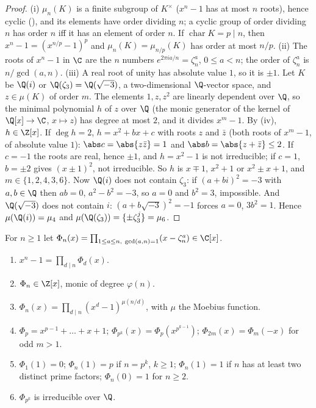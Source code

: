 \begin{proof}
(i) $\mu_n(K)$ is a finite subgroup of $K^\times$ ($x^n-1$ has at most $n$ roots), hence cyclic (), and its elements have order
dividing $n$; a cyclic group of order dividing $n$ has order $n$ iff it has an element of order $n$. If $\operatorname{char}K=p\mid n$, then
$x^n-1=(x^{n/p}-1)^p$ and $\mu_n(K)=\mu_{n/p}(K)$ has order at most $n/p$.
(ii) The roots of $x^n-1$ in $\C$ are the $n$ numbers $e^{2\pi ia/n}=\zeta_n^a$, $0\le a<n$; the order of $\zeta_n^a$ is $n/\gcd(a,n)$.
(iii) A real root of unity has absolute value $1$, so it is $\pm1$. Let $K$ be $\Q(i)$ or $\Q(\zeta_3)=\Q(\sqrt{-3})$, a two-dimensional $\Q$-vector space,
and $z\in\mu(K)$ of order $m$. The elements $1,z,z^2$ are linearly dependent over $\Q$, so the minimal polynomial $h$ of $z$ over $\Q$ (the
monic generator of the kernel of $\Q[x]\to\C$, $x\mapsto z$) has degree at most $2$, and it divides $x^m-1$. By (iv), $h\in\Z[x]$.
If $\deg h=2$, $h=x^2+bx+c$ with roots $z$ and $\bar z$ (both roots of $x^m-1$, of absolute value $1$): $\abs c=\abs{z\bar z}=1$ and $\abs b=\abs{z+\bar z}\le2$.
If $c=-1$ the roots are real, hence $\pm1$, and $h=x^2-1$ is not irreducible; if $c=1$, $b=\pm2$ gives $(x\pm1)^2$, not irreducible. So $h$ is
$x\mp1$, $x^2+1$ or $x^2\pm x+1$, and $m\in\{1,2,4,3,6\}$. Now $\Q(i)$ does not contain $\zeta_3$: if $(a+bi)^2=-3$ with $a,b\in\Q$ then $ab=0$, $a^2-b^2=-3$, so
$a=0$ and $b^2=3$, impossible. And $\Q(\sqrt{-3})$ does not contain $i$: $(a+b\sqrt{-3})^2=-1$ forces $a=0$, $3b^2=1$. Hence $\mu(\Q(i))=\mu_4$ and
$\mu(\Q(\zeta_3))=\{\pm\zeta_3^j\}=\mu_6$.
\end{proof}

\begin{theorem}\label{thm:rings:cyclotomic}
For $n\ge1$ let $\Phi_n(x)=\prod_{1\le a\le n,\ \gcd(a,n)=1}(x-\zeta_n^a)\in\C[x]$.
\begin{enumerate}[label=(\roman*)]
\item $x^n-1=\prod_{d\mid n}\Phi_d(x)$.
\item $\Phi_n\in\Z[x]$, monic of degree $\varphi(n)$.
\item $\Phi_n(x)=\prod_{d\mid n}(x^d-1)^{\mu(n/d)}$, with $\mu$ the Moebius function.
\item $\Phi_p=x^{p-1}+\dots+x+1$; $\Phi_{p^k}(x)=\Phi_p(x^{p^{k-1}})$; $\Phi_{2m}(x)=\Phi_m(-x)$ for odd $m>1$.
\item $\Phi_1(1)=0$; $\Phi_n(1)=p$ if $n=p^k$, $k\ge1$; $\Phi_n(1)=1$ if $n$ has at least two distinct prime factors; $\Phi_n(0)=1$ for $n\ge2$.
\item $\Phi_{p^k}$ is irreducible over $\Q$.
\end{enumerate}
\end{theorem}

